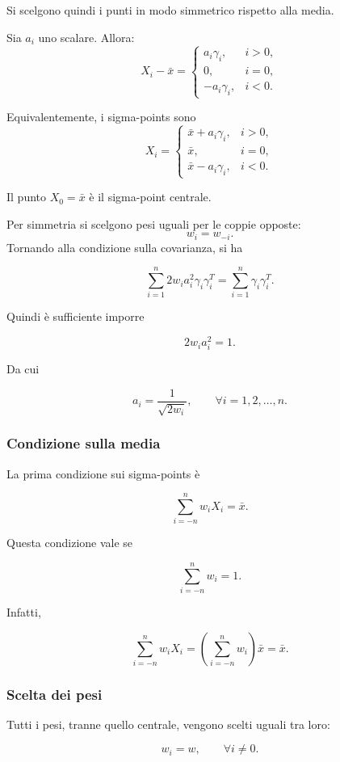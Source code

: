 \documentclass[11pt,a4paper]{article}
\begin{document}
Si scelgono quindi i punti in modo simmetrico rispetto alla media.

Sia \(a_i\) uno scalare. Allora:
\[
X_i-\bar x=
\begin{cases}
a_i\gamma_i, & i>0,\\[0.3em]
0, & i=0,\\[0.3em]
-a_i\gamma_i, & i<0.
\end{cases}
\]

Equivalentemente, i sigma-points sono
\[
X_i=
\begin{cases}
\bar x+a_i\gamma_i, & i>0,\\[0.3em]
\bar x, & i=0,\\[0.3em]
\bar x-a_i\gamma_i, & i<0.
\end{cases}
\]

Il punto \(X_0=\bar x\) è il sigma-point centrale.

Per simmetria si scelgono pesi uguali per le coppie opposte:
\[
w_i=w_{-i}.
\]
Tornando alla condizione sulla covarianza, si ha

\[
\sum_{i=1}^{n} 2w_i a_i^2 \gamma_i\gamma_i^T
=
\sum_{i=1}^{n}\gamma_i\gamma_i^T.
\]

Quindi è sufficiente imporre

\[
2w_i a_i^2 = 1.
\]

Da cui

\[
a_i=\frac{1}{\sqrt{2w_i}},
\qquad
\forall i=1,2,\dots,n.
\]

\subsubsection*{Condizione sulla media}

La prima condizione sui sigma-points è

\[
\sum_{i=-n}^{n} w_i X_i = \bar x.
\tag{1}
\]

Questa condizione vale se

\[
\sum_{i=-n}^{n} w_i = 1.
\]

Infatti,

\[
\sum_{i=-n}^{n} w_i X_i
=
\left(\sum_{i=-n}^{n} w_i\right)\bar x
=
\bar x.
\]

\subsubsection*{Scelta dei pesi}

Tutti i pesi, tranne quello centrale, vengono scelti uguali tra loro:

\[
w_i=w,
\qquad \forall i\neq 0.
\]
\end{document}
